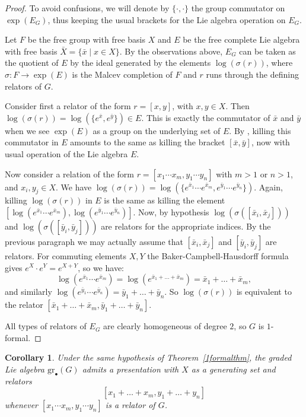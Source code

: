 \documentclass[10pt]{amsart}
\newtheorem{crlr}[theorem]{Corollary}
\theoremstyle{definition}
\newcommand{\gr}{\mathrm{gr}_\bullet}
\theoremstyle{definition}
\numberwithin{equation}{section}
\begin{document}
\begin{proof}
To avoid confusions, we will denote by $\{\cdot, \cdot\}$ the group commutator on $\exp(E_G)$, thus keeping the usual brackets for the Lie algebra
operation on $E_G$.

Let $F$ be the free group with free basis $X$ and $E$ be the free complete Lie algebra with free basis $\bar{X} = \{\bar{x} \mid x \in X\}$. By the observations above, $E_G$ can be taken as the quotient of $E$ by the ideal generated by the elements $\log(\sigma(r))$, where $\sigma \colon F \to \exp(E)$ is the Malcev completion of $F$ and $r$ runs through the
defining relators of $G$.

Consider first a relator of the form $r=[x,y]$, with $x,y \in X$. Then $\log(\sigma(r))=\log(\{e^{\bar{x}},e^{\bar{y}}\}) \in E$. This is exactly the commutator of $\bar{x}$ and $\bar{y}$ when we see $\exp(E)$ as a group on the underlying set of $E$. By \cite[Lemma~2.5]{Papadima2}, killing this commutator
in $E$ amounts to the same as killing the bracket $[\bar{x},\bar{y}]$, now with usual operation of the Lie algebra $E$.

Now consider a relation of the form $r = [x_1 \cdots x_m, y_1 \cdots y_n]$ with $m > 1$ or $n > 1$, and $x_i,y_j \in X$. We have
$\log(\sigma(r))=\log(\{e^{\bar{x}_1} \cdots e^{\bar{x}_m}, e^{\bar{y}_1} \cdots e^{\bar{y}_n}\})$.
Again, killing $\log(\sigma(r))$ in $E$ is the same as killing the element $[\log(e^{\bar{x}_1} \cdots e^{\bar{x}_m}), \log(e^{\bar{y}_1} \cdots e^{\bar{y}_n})]$. Now, by hypothesis
$\log(\sigma([\bar{x}_i,\bar{x}_j]))$ and $\log(\sigma([\bar{y}_i,\bar{y}_j]))$ are relators for the appropriate indices. By the previous paragraph we may actually assume that $[\bar{x}_i,\bar{x}_j]$ and $[\bar{y}_i, \bar{y}_j]$ are relators.  For commuting elements $X,Y$ the Baker-Campbell-Hausdorff formula gives $e^X \cdot e^Y = e^{X+Y}$, so  we have:
\[\log(e^{\bar{x}_1} \cdots e^{\bar{x}_m}) = \log( e^{\bar{x}_1 + \ldots + \bar{x}_m} ) = \bar{x}_1 + \ldots + \bar{x}_m,\]
and similarly $\log(e^{\bar{y}_1} \cdots e^{\bar{y}_n}) = \bar{y}_1 + \ldots + \bar{y}_n$. So $\log(\sigma(r))$ is equivalent to the relator $[\bar{x}_1 + \ldots + \bar{x}_m, \bar{y}_1 + \ldots + \bar{y}_n]$.

All types of relators of $E_G$ are clearly homogeneous of degree $2$, so $G$ is $1$-formal.
\end{proof}

\begin{crlr}  \label{crlr1}
Under the same hypothesis of Theorem~\ref{1formalthm}, the graded Lie algebra $\gr(G)$ admits a presentation with $X$ as a generating set
and relators \[[x_1 + \ldots +x_m, y_1 + \ldots + y_n]\] whenever $[x_1 \cdots x_m, y_1 \cdots y_n]$ is a relator of $G$.
\end{crlr}
\end{document}
